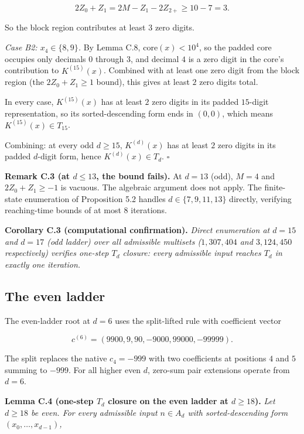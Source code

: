 \documentclass[11pt,letterpaper]{article}
\theoremstyle{paperstyle}
\theoremstyle{paperstyledef}
\theoremstyle{paperstylerem}
\begin{document}
\[2 Z_0 + Z_1 = 2M - Z_1 - 2 Z_{2+} \geq 10 - 7 = 3.\]

So the block region contributes at least \(3\) zero digits.

\emph{Case B2: \(x_4 \in \{8, 9\}\).} By Lemma C.8,
\(\mathrm{core}(x) < 10^4\), so the padded core occupies only decimals
\(0\) through \(3\), and decimal \(4\) is a zero digit in the core's
contribution to \(K^{(15)}(x)\). Combined with at least one zero digit
from the block region (the \(2 Z_0 + Z_1 \geq 1\) bound), this gives at
least \(2\) zero digits total.

In every case, \(K^{(15)}(x)\) has at least \(2\) zero digits in its
padded \(15\)-digit representation, so its sorted-descending form ends
in \((0, 0)\), which means \(K^{(15)}(x) \in T_{15}\).

Combining: at every odd \(d \geq 15\), \(K^{(d)}(x)\) has at least \(2\)
zero digits in its padded \(d\)-digit form, hence
\(K^{(d)}(x) \in T_d\). \(\square\)

\textbf{Remark C.3 (at \(d \leq 13\), the bound fails).} At \(d = 13\)
(odd), \(M = 4\) and \(2 Z_0 + Z_1 \geq -1\) is vacuous. The algebraic
argument does not apply. The finite-state enumeration of Proposition 5.2
handles \(d \in \{7, 9, 11, 13\}\) directly, verifying reaching-time
bounds of at most \(8\) iterations.

\textbf{Corollary C.3 (computational confirmation).} \emph{Direct
enumeration at \(d = 15\) and \(d = 17\) (odd ladder) over all
admissible multisets (\(1{,}307{,}404\) and \(3{,}124{,}450\)
respectively) verifies one-step \(T_d\) closure: every admissible input
reaches \(T_d\) in exactly one iteration.}

\hypertarget{c.5-the-even-ladder}{%
\subsection{The even ladder}\label{c.5-the-even-ladder}}

The even-ladder root at \(d = 6\) uses the split-lifted rule with
coefficient vector

\[c^{(6)} = (9900, 9, 90, -9000, 99000, -99999).\]

The split replaces the native \(c_4 = -999\) with two coefficients at
positions \(4\) and \(5\) summing to \(-999\). For all higher even
\(d\), zero-sum pair extensions operate from \(d = 6\).

\textbf{Lemma C.4 (one-step \(T_d\) closure on the even ladder at
\(d \geq 18\)).} \emph{Let \(d \geq 18\) be even. For every admissible
input \(n \in A_d\) with sorted-descending form
\((x_0, \ldots, x_{d-1})\),}
\end{document}
